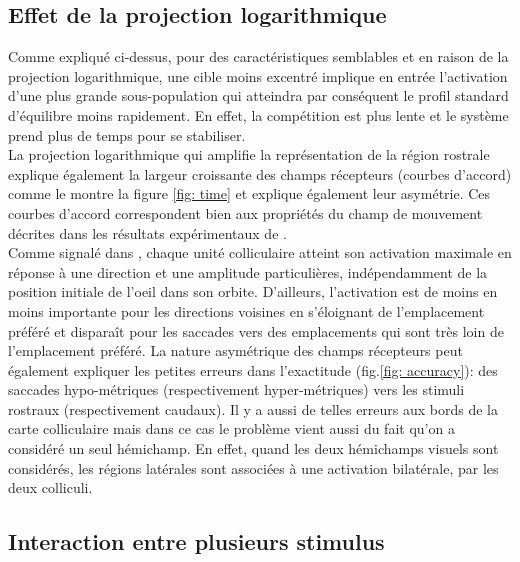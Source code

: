 \subsection{Effet de la projection logarithmique}

Comme expliqué ci-dessus, pour des caractéristiques semblables et en raison de la projection logarithmique, une cible moins excentré implique en entrée l'activation d'une plus grande sous-population qui atteindra par conséquent le profil standard d'équilibre moins rapidement. En effet, la compétition est plus lente et le système prend plus de temps pour se stabiliser.\\ %
La projection logarithmique qui amplifie la représentation de la région rostrale explique également la largeur croissante des champs récepteurs (courbes d'accord) comme le montre la figure \ref{fig: time} et explique également leur asymétrie. Ces courbes d'accord correspondent bien aux propriétés du champ de mouvement décrites dans les résultats expérimentaux de \cite{Munoz:1995a, Sparks:1976}. \\

Comme signalé dans \cite{Sparks:1980}, chaque unité colliculaire atteint son activation maximale en réponse à une direction et une amplitude particulières, indépendamment de la position initiale de l'oeil dans son orbite. D'ailleurs, l'activation est de moins en moins importante pour les directions voisines en s'éloignant de l'emplacement préféré et disparaît pour les saccades vers des emplacements qui sont très loin de l'emplacement préféré. La nature asymétrique des champs récepteurs peut également expliquer les petites erreurs dans l'exactitude (fig.\ref{fig: accuracy}): des saccades hypo-métriques (respectivement hyper-métriques) vers les stimuli rostraux (respectivement caudaux). Il y a aussi de telles erreurs aux bords de la carte colliculaire mais dans ce cas le problème vient aussi du fait qu'on a considéré un seul hémichamp. En effet, quand les deux hémichamps visuels sont considérés, les régions latérales sont associées à une activation bilatérale, par les deux colliculi.


\subsection{Interaction entre plusieurs stimulus}

